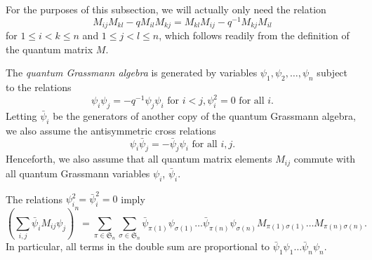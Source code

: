 \documentclass[12pt, reqno]{amsart}
\theoremstyle{definition}
\newcommand{\be}{\begin{equation}}
\newcommand{\ee}{\end{equation}}
\begin{document}
For the purposes of this subsection, we will actually only need the relation
\be \label{eq:mainRelation}
M_{i j} M_{k l} - q M_{i l} M_{k j}
= 
M_{k l} M_{i j} - q^{-1} M_{k j} M_{i l}
\ee 
for $1\leq i<k\leq n$ and $1\leq j<l\leq n$, which follows readily from the definition of the quantum matrix $M$.  

The \textit{quantum Grassmann algebra} is generated by variables $\psi_1, \psi_2, \dots, \psi_n$ subject to the relations  
$$
\psi_i \psi_j = -q^{-1} \psi_j \psi_i  \text{ for } i < j, 
\psi_i^2 = 0  \text{ for all } i.
$$
Letting $\bar{\psi}_i$ be the generators of another copy of the quantum Grassmann algebra, we also assume the antisymmetric cross relations
$$
{\psi}_i \bar{\psi}_j = - \bar{\psi}_j {\psi}_i  \text{ for all } i,j.
$$
Henceforth, we also assume that all quantum matrix elements $M_{ij}$ commute with all quantum Grassmann variables $\psi_i$, $\bar{\psi}_i$.

The relations $\psi_i^2 = \bar{\psi}_i^2 = 0$ imply 
$$
\left(\sum_{i,j} \bar{\psi}_i  M_{i j}\psi_j\right)^n
=
\sum_{\pi \in \mathfrak{S}_n} \sum_{\sigma \in \mathfrak{S}_n}
\bar{\psi}_{\pi(1)} \psi_{\sigma(1)} \dots \bar{\psi}_{\pi(n)} \psi_{\sigma(n)}
M_{\pi(1) \sigma(1)} \dots M_{\pi(n) \sigma(n)}.
$$
In particular, all terms in the double sum are proportional to $\bar{\psi}_{1}{\psi}_{1} \dots \bar{\psi}_{n}{\psi}_{n}$.  
\end{document}
